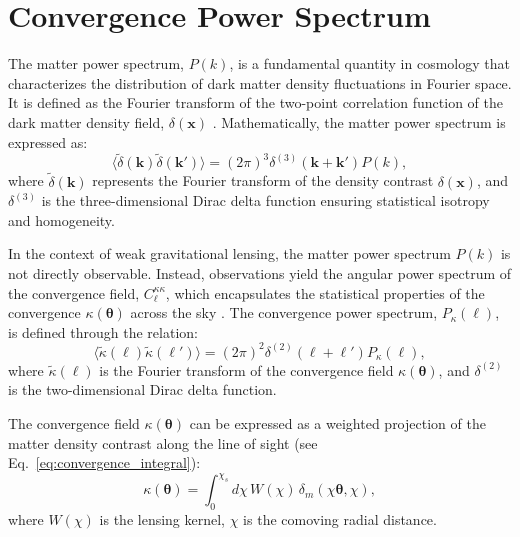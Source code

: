 \section{Convergence Power Spectrum}
The matter power spectrum, \( P(k) \), is a fundamental quantity in cosmology that characterizes the distribution of dark matter density fluctuations in Fourier space. It is defined as the Fourier transform of the two-point correlation function of the dark matter density field, \( \delta(\mathbf{x}) \) \citep{2001PhR...340..291B}. Mathematically, the matter power spectrum is expressed as:
\begin{equation}
    \langle \tilde{\delta}(\mathbf{k}) \tilde{\delta}(\mathbf{k}') \rangle = (2\pi)^3 \delta^{(3)}(\mathbf{k} + \mathbf{k}') P(k),
    \label{eq:matter_power_spectrum}
\end{equation}
where \( \tilde{\delta}(\mathbf{k}) \) represents the Fourier transform of the density contrast \( \delta(\mathbf{x}) \), and \( \delta^{(3)} \) is the three-dimensional Dirac delta function ensuring statistical isotropy and homogeneity.

In the context of weak gravitational lensing, the matter power spectrum \( P(k) \) is not directly observable. Instead, observations yield the angular power spectrum of the convergence field, \( C_{\ell}^{\kappa\kappa} \), which encapsulates the statistical properties of the convergence \( \kappa(\boldsymbol{\theta}) \) across the sky \citep{2001PhR...340..291B}. The convergence power spectrum, \( P_{\kappa}(\ell) \), is defined through the relation:
\begin{equation}
    \langle \tilde{\kappa}(\boldsymbol{\ell}) \tilde{\kappa}(\boldsymbol{\ell}') \rangle = (2\pi)^2 \delta^{(2)}(\boldsymbol{\ell} + \boldsymbol{\ell}') P_{\kappa}(\ell),
    \label{eq:convergence_power_spectrum}
\end{equation}
where \( \tilde{\kappa}(\boldsymbol{\ell}) \) is the Fourier transform of the convergence field \( \kappa(\boldsymbol{\theta}) \), and \( \delta^{(2)} \) is the two-dimensional Dirac delta function.

The convergence field \( \kappa(\boldsymbol{\theta}) \) can be expressed as a weighted projection of the matter density contrast along the line of sight (see Eq.~\eqref{eq:convergence_integral}):
\begin{equation}
    \kappa(\boldsymbol{\theta}) = \int_0^{\chi_s} d\chi \, W(\chi) \, \delta_m\left(\chi \boldsymbol{\theta}, \chi\right),
    \label{eq:kappa_projection}
\end{equation}
where \( W(\chi) \) is the lensing kernel, \( \chi \) is the comoving radial distance.

